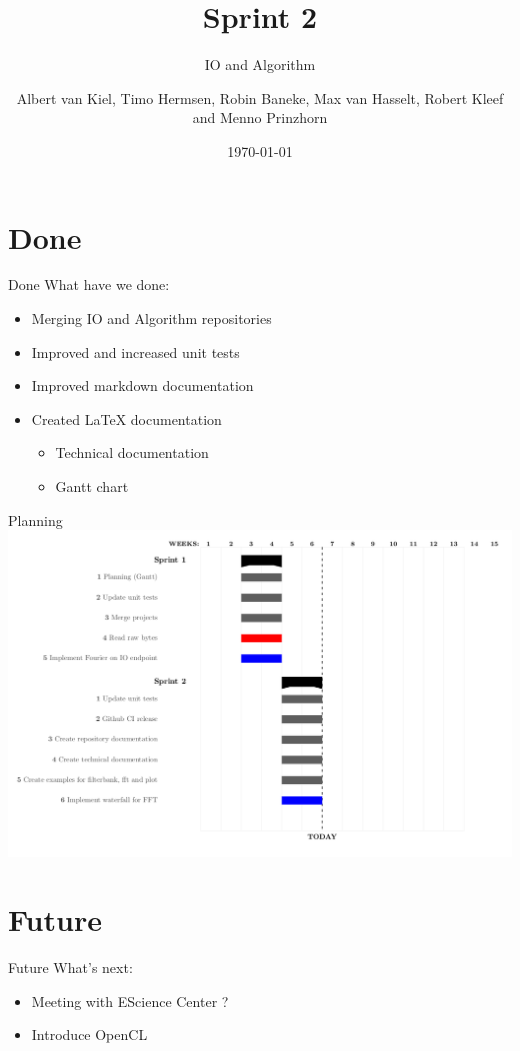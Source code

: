 \documentclass{beamer}
\title{Sprint 2}
\subtitle{IO and Algorithm}
\author{Albert van Kiel, Timo Hermsen, Robin Baneke, Max van Hasselt, Robert Kleef and Menno Prinzhorn}
\date{\today}
\begin{document}
    
    \begin{frame}
        \titlepage
    \end{frame}
    
    \section{Done}

    \begin{frame}{Done}
        What have we done:
        \begin{itemize}
            \item Merging IO and Algorithm repositories
            \item Improved and increased unit tests
            \item Improved markdown documentation
            \item Created LaTeX documentation
            \begin{itemize}
                \item Technical documentation
                \item Gantt chart
            \end{itemize}
        \end{itemize}
    \end{frame}

    \begin{frame}{Planning}
        \includegraphics[scale=0.25]{planning}
    \end{frame}
    
    \section{Future}
    
    \begin{frame}{Future}
        What's next:       
        \begin{itemize}
            \item Meeting with EScience Center ?
            \item Introduce OpenCL
        \end{itemize}
    \end{frame}
    
    
\end{document}
